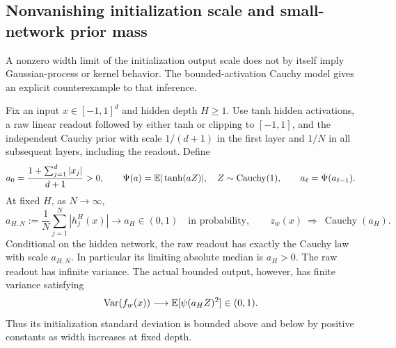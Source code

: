 \subsection{Nonvanishing initialization scale and small-network prior mass}
\label{sec:cauchy-native-scale}
A nonzero width limit of the initialization output scale does not by itself imply Gaussian-process or kernel behavior. The bounded-activation Cauchy model gives an explicit counterexample to that inference.

\begin{proposition}
\label{prop:cauchy-native-scale}
Fix an input $x\in[-1,1]^d$ and hidden depth $H\ge1$. Use tanh hidden activations, a raw linear readout followed by either tanh or clipping to $[-1,1]$, and the independent Cauchy prior with scale $1/(d+1)$ in the first layer and $1/N$ in all subsequent layers, including the readout. Define
\[
 a_0=\frac{1+\sum_{j=1}^d|x_j|}{d+1}>0,
 \qquad \Psi(a)=\mathbb E|\tanh(aZ)|,\quad Z\sim\operatorname{Cauchy}(1),
 \qquad a_\ell=\Psi(a_{\ell-1}).
\]
At fixed $H$, as $N\to\infty$,
\[
 a_{H,N}:=\frac1N\sum_{j=1}^N|h_j^H(x)|
 \longrightarrow a_H\in(0,1)
 \quad\text{in probability},
 \qquad z_w(x)\ \Longrightarrow\ \operatorname{Cauchy}(a_H).
\]
Conditional on the hidden network, the raw readout has exactly the Cauchy law with scale $a_{H,N}$. In particular its limiting absolute median is $a_H>0$. The raw readout has infinite variance. The actual bounded output, however, has finite variance satisfying
\[
 \operatorname{Var}(f_w(x))\longrightarrow
 \mathbb E[\psi(a_H Z)^2]\in(0,1).
\]
Thus its initialization standard deviation is bounded above and below by positive constants as width increases at fixed depth.
\end{proposition}
